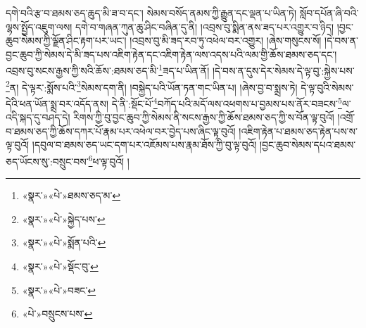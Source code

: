 དགེ་བའི་རྩ་བ་ཐམས་ཅད་ཆུད་མི་ཟ་བ་དང་། སེམས་བསོད་ནམས་ཀྱི་རྒྱུན་དང་ལྡན་པ་ཡིན་ཏེ། སློབ་དཔོན་ཞི་བའི་ལྷས་སྤྱོད་འཇུག་ལས། དགེ་བ་གཞན་ཀུན་ཆུ་ཤིང་བཞིན་དུ་ནི། །འབྲས་བུ་སྨིན་ནས་ཟད་པར་འགྱུར་བ་ཉིད། །བྱང་ཆུབ་སེམས་ཀྱི་ལྗོན་ཤིང་རྟག་པར་ཡང་། །འབྲས་བུ་མི་ཟད་རབ་ཏུ་འཕེལ་བར་འགྱུར། །ཞེས་གསུངས་སོ། །དེ་བས་ན་བྱང་ཆུབ་ཀྱི་སེམས་དེ་མི་ཟད་པས་འཇིག་རྟེན་དང་འཇིག་རྟེན་ལས་འདས་པའི་ལམ་གྱི་ཆོས་ཐམས་ཅད་དང་། འབྲས་བུ་སངས་རྒྱས་ཀྱི་སའི་ཆོས་:ཐམས་ཅད་མི་\footnote{«སྣར་»«པེ་»ཐམས་ཅད་མ་}ཟད་པ་ཡིན་ནོ། །དེ་བས་ན་དུས་དེར་སེམས་དེ་ལྟ་བུ་:སྐྱེས་པས་\footnote{«སྣར་»«པེ་»སྐྱེད་པས་}ན། དེ་ལྟར་:སྨོས་པའི་\footnote{«སྣར་»«པེ་»སྨོན་པའི་}སེམས་དག་ནི། །བསྐྱེད་པའི་ཡོན་ཏན་གང་ཡིན་པ། །ཞེས་བྱ་བ་སྨྲས་ཏེ། དེ་ལྟ་བུའི་སེམས་དེའི་ཕན་ཡོན་སྨྲ་བར་འདོད་ནས། དེ་ནི་:སྡོང་པོ་\footnote{«སྣར་»«པེ་»སྡོང་བུ་}བཀོད་པའི་མདོ་ལས་འཕགས་པ་བྱམས་པས་ནོར་བཟངས་\footnote{«སྣར་»«པེ་»བཟང་}ལ་འདི་སྐད་དུ་བཤད་དེ། རིགས་ཀྱི་བུ་བྱང་ཆུབ་ཀྱི་སེམས་ནི་སངས་རྒྱས་ཀྱི་ཆོས་ཐམས་ཅད་ཀྱི་ས་བོན་ལྟ་བུའོ། །འགྲོ་བ་ཐམས་ཅད་ཀྱི་ཆོས་དཀར་པོ་རྣམ་པར་འཕེལ་བར་བྱེད་པས་ཞིང་ལྟ་བུའོ། །འཇིག་རྟེན་པ་ཐམས་ཅད་རྟེན་པས་ས་ལྟ་བུའོ། །དབུལ་བ་ཐམས་ཅད་ཡང་དག་པར་འཇོམས་པས་རྣམ་ཐོས་ཀྱི་བུ་ལྟ་བུའོ། །བྱང་ཆུབ་སེམས་དཔའ་ཐམས་ཅད་ཡོངས་སུ་:བསྲུང་བས་\footnote{«པེ་»བསྲུངས་པས་}ཕ་ལྟ་བུའོ། །
